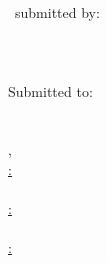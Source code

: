 \begin{titlepage}
  \strut
  \hfill
  \begin{center}
  \vspace{1cm}
    \Huge
    \textbf{\DocumentTitle}\\
    \vspace{0.5cm}
    \large
    \DocumentSubtitle\\
    \vspace{1.0cm}
    \large
    \DocumentType\ submitted by:\\
    \vspace{0.8cm}
    \textbf{\AuthorName}\\
    \AuthorDetails\\
    \AuthorEmail\\
    \vspace{1cm}
    Submitted to:\\
    \vspace{0.5cm}
    \InstitutionName\\
    \DepartmentName\\
    \vspace{1.2cm}
    \DocumentLocation, \DocumentDate\\
    \vspace{1.0cm}
    \large
    \underline{\ReviewerOneLabel:}\\
    \ReviewerOne\\
    \vspace{0.5cm}
    \underline{\ReviewerTwoLabel:}\\
    \ReviewerTwo\\
    \vspace{0.5cm}
    \underline{\SupervisorLabel:}\\
    \Supervisor
  \end{center}
\end{titlepage}
